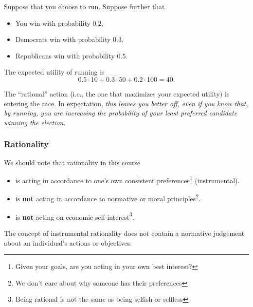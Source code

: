 \documentclass[letterpaper]{article}
\begin{document}
\begin{mdframed}
    Suppose that you choose to run. Suppose further that 
    \begin{itemize}
        \item You win with probability $0.2$,
        \item Democrats win with probability $0.3$,
        \item Republicans win with probability $0.5$. 
    \end{itemize}
    The expected utility of running is 
    \[0.5 \cdot 10 + 0.3 \cdot 50 + 0.2 \cdot 100 = \boxed{40}.\]

    The ``rational'' action (i.e., the one that maximizes your expected utility) is entering the race. In expectation, \emph{this leaves you better off, even if you know that, by running, you are increasing the probability of your least preferred candidate winning the election.}
\end{mdframed}

\subsubsection{Rationality}
We should note that rationality in this course 
\begin{itemize}
    \item is acting in accordance to one's own consistent preferences\footnote{Given your goals, are you acting in your own best interest?} (instrumental).
    \item is \textbf{not} acting in accordance to normative or moral principles\footnote{We don't care about why someone has their preferences}.
    \item is \textbf{not} acting on economic self-interest\footnote{Being rational is not the same as being selfish or selfless}.
\end{itemize}
The concept of instrumental rationality does not contain a normative judgement about an individual's actions or objectives.
\end{document}
